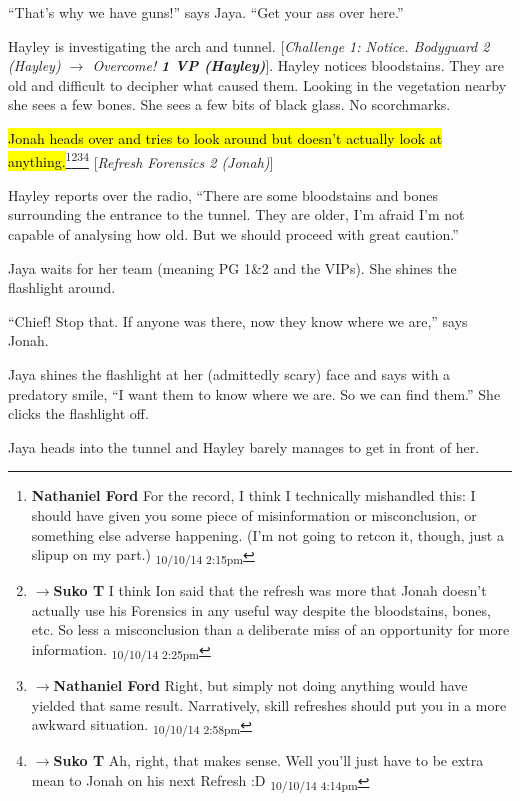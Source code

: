 ``That's why we have guns!'' says Jaya.  ``Get your ass over here.''

Hayley is investigating the arch and tunnel.  {[}\textit{Challenge 1: Notice.  Bodyguard 2 (Hayley) $\rightarrow$ Overcome! }\textit{\textbf{1 VP (Hayley)}}{]}.   Hayley notices bloodstains.  They are old and difficult to decipher what caused them.  Looking in the vegetation nearby she sees a few bones.  She sees a few bits of black glass.  No scorchmarks.

\hl{Jonah heads over and tries to look around but doesn't actually look at anything.}\footnote{\textbf{Nathaniel Ford }For the record, I think I technically mishandled this: I should have given you some piece of misinformation or misconclusion, or something else adverse happening. (I'm not going to retcon it, though, just a slipup on my part.) \textsubscript{10/10/14 2:15pm}}\footnote{$\rightarrow$\textbf{Suko T }I think Ion said that the refresh was more that Jonah doesn't actually use his Forensics in any useful way despite the bloodstains, bones, etc.  So less a misconclusion than a deliberate miss of an opportunity for more information. \textsubscript{10/10/14 2:25pm}}\footnote{$\rightarrow$\textbf{Nathaniel Ford }Right, but simply not doing anything would have yielded that same result. Narratively, skill refreshes should put you in a more awkward situation. \textsubscript{10/10/14 2:58pm}}\footnote{$\rightarrow$\textbf{Suko T }Ah, right, that makes sense. Well you'll just have to be extra mean to Jonah on his next Refresh :D \textsubscript{10/10/14 4:14pm}} {[}\textit{Refresh Forensics 2 (Jonah)}{]}

Hayley reports over the radio, ``There are some bloodstains and bones surrounding the entrance to the tunnel.  They are older, I'm afraid I'm not capable of analysing how old.  But we should proceed with great caution.''

Jaya waits for her team (meaning PG 1\&2 and the VIPs).  She shines the flashlight around.

``Chief!  Stop that.  If anyone was there, now they know where we are,'' says Jonah.

Jaya shines the flashlight at her (admittedly scary) face and says with a predatory smile, ``I want them to know where we are.  So we can find them.'' She clicks the flashlight off.



Jaya heads into the tunnel and Hayley barely manages to get in front of her.  



